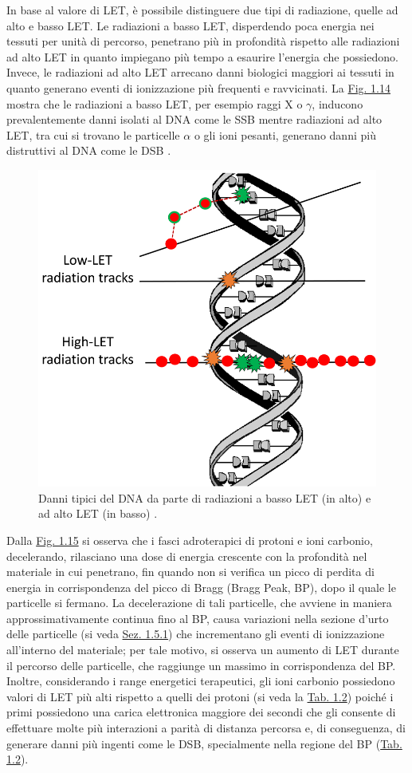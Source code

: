 \documentclass[12pt,a4paper,twoside]{report}
\begin{document}
	In base al valore di LET, è possibile distinguere due tipi di radiazione, quelle ad alto e basso LET. Le radiazioni a basso LET, disperdendo poca energia nei tessuti per unità di percorso, penetrano più in profondità rispetto alle radiazioni ad alto LET in quanto impiegano più tempo a esaurire l'energia che possiedono. Invece, le radiazioni ad alto LET arrecano danni biologici maggiori ai tessuti in quanto generano eventi di ionizzazione più frequenti e ravvicinati. La \hyperref[fig:damage_let]{Fig. 1.14} mostra che le radiazioni a basso LET, per esempio raggi X o $\gamma$, inducono prevalentemente danni isolati al DNA come le SSB mentre radiazioni ad alto LET, tra cui si trovano le particelle $\alpha$ o gli ioni pesanti, generano danni più distruttivi al DNA come le DSB \cite{Roobol2020-fp}.
	\begin{figure}[H]
		\centering
		\includegraphics[width=0.6\linewidth]{damage_let.png}
		\caption{Danni tipici del DNA da parte di radiazioni a basso LET (in alto) e ad alto LET (in basso) \cite{Fabbrizi_Parsons_2022}.}
		\label{fig:damage_let}
	\end{figure}
	Dalla \hyperref[fig:proton_carbon_let]{Fig. 1.15} si osserva che i fasci adroterapici di protoni e ioni carbonio, decelerando, rilasciano una dose di energia crescente con la profondità nel materiale in cui penetrano, fin quando non si verifica un picco di perdita di energia in corrispondenza del picco di Bragg (Bragg Peak, BP), dopo il quale le particelle si fermano. La decelerazione di tali particelle, che avviene in maniera approssimativamente continua fino al BP, causa variazioni nella sezione d'urto delle particelle (si veda \hyperref[sec:sezione_urto]{Sez. 1.5.1}) che incrementano gli eventi di ionizzazione all'interno del materiale; per tale motivo, si osserva un aumento di LET durante il percorso delle particelle, che raggiunge un massimo in corrispondenza del BP. Inoltre, considerando i range energetici terapeutici, gli ioni carbonio possiedono valori di LET più alti rispetto a quelli dei protoni (si veda la \hyperref[tab:let_rbe]{Tab. 1.2}) poiché i primi possiedono una carica elettronica maggiore dei secondi che gli consente di effettuare molte più interazioni a parità di distanza percorsa e, di conseguenza, di generare danni più ingenti come le DSB, specialmente nella regione del BP (\hyperref[tab:let_rbe]{Tab. 1.2}).
\end{document}

